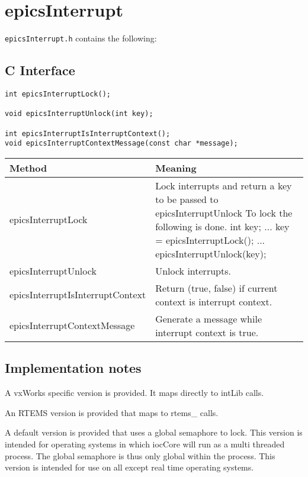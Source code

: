 \section{epicsInterrupt}

\verb|epicsInterrupt.h| contains the following:

\subsection{C Interface}

\begin{verbatim}
int epicsInterruptLock();

void epicsInterruptUnlock(int key);

int epicsInterruptIsInterruptContext();
void epicsInterruptContextMessage(const char *message);
\end{verbatim}

\begin{center}
\begin{longtable}{p{1.97222in}p{3.66667in}}
\textbf{Method} & \textbf{Meaning}\\
\hline
epicsInterruptLock & Lock interrupts and return a key to be passed to epicsInterruptUnlock To lock the following is done.       int key;      ...      key = epicsInterruptLock();       ...       epicsInterruptUnlock(key);\\
epicsInterruptUnlock & Unlock interrupts.\\
epicsInterruptIsInterruptContext & Return (true, false) if current context is interrupt context.\\
epicsInterruptContextMessage & Generate a message while interrupt context is true.
\end{longtable}

\end{center}


\subsection{Implementation notes}

A vxWorks specific version is provided. It maps directly to intLib calls.

An RTEMS version is provided that maps to rtems\_ calls.

A default version is provided that uses a global semaphore to lock. This version is intended for operating systems in 
which iocCore will run as a multi threaded process. The global semaphore is thus only global within the process. This 
version is intended for use on all except real time operating systems.

